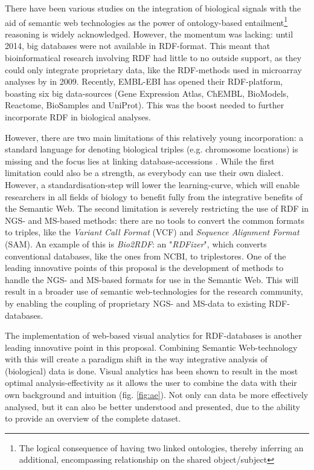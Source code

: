 \documentclass[twoside,fontsize=10pt]{article}
\begin{document}
\noindent
There have been various studies on the integration of biological signals with the aid of semantic web technologies as the power of ontology-based entailment\footnote{The logical consequence of having two linked ontologies, thereby inferring an additional, encompassing relationship on the shared object/subject} reasoning is widely acknowledged\cite{Sahoo2008}. However, the momentum was lacking: until 2014, big databases were not available in RDF-format. This meant that bioinformatical research involving RDF had little to no outside support, as they could only integrate proprietary data, like the RDF-methods used in microarray analyses by \citet{Szpakowski2009} in 2009. Recently, EMBL-EBI has opened their RDF-platform, boasting six big data-sources (Gene Expression Atlas, ChEMBL, BioModels, Reactome, BioSamples and UniProt)\cite{Jupp2014}. This was the boost needed to further incorporate RDF in biological analyses.

However, there are two main limitations of this relatively young incorporation: a standard language for denoting biological triples (e.g. chromosome locations) is missing and the focus lies at linking database-accessions \citep{Ruttenberg2007}. While the first limitation could also be a strength, as everybody can use their own dialect. However, a standardisation-step will lower the learning-curve, which will enable researchers in all fields of biology to benefit fully from the integrative benefits of the Semantic Web. The second limitation is severely restricting the use of RDF in NGS- and MS-based methods: there are no tools to convert the common formats to triples, like the \textit{Variant Call Format} (VCF) and \textit{Sequence Alignment Format} (SAM). An example of this is  \textit{Bio2RDF}\cite{Belleau2008}: an "\textit{RDFizer}", which converts conventional databases, like the ones from NCBI, to triplestores. One of the leading innovative points of this proposal is the development of methods to handle the NGS- and MS-based formats for use in the Semantic Web. This will result in a broader use of semantic web-technologies for the research community, by enabling the coupling of proprietary NGS- and MS-data to existing RDF-databases.
\medskip

\noindent
The implementation of web-based visual analytics for RDF-databases is another leading innovative point in this proposal. Combining Semantic Web-technology with this will create a paradigm shift in the way integrative analysis of (biological) data is done. Visual analytics has been shown to result in the most optimal analysis-effectivity as it allows the user to combine the data with their own background and intuition (fig. \ref{fig:ae}). Not only can data be more effectively analysed, but it can also be better understood and presented, due to the ability to provide an overview of the complete dataset\cite{Thomas2005, Keim}. 
\medskip
\end{document}
